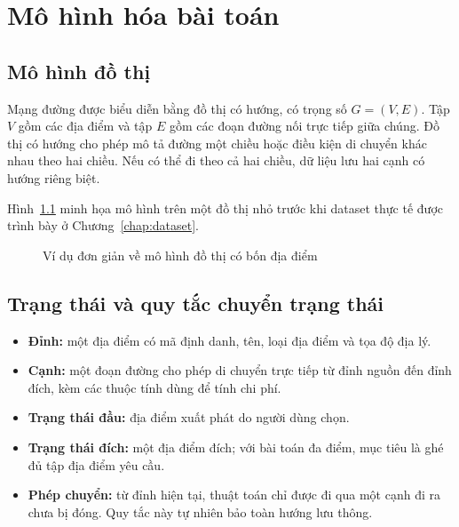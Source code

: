 
\chapter{Mô hình hóa bài toán}
\label{chap:problem-modeling}

\section{Mô hình đồ thị}

Mạng đường được biểu diễn bằng đồ thị có hướng, có trọng số $G=(V,E)$. Tập
$V$ gồm các địa điểm và tập $E$ gồm các đoạn đường nối trực tiếp giữa chúng.
Đồ thị có hướng cho phép mô tả đường một chiều hoặc điều kiện di chuyển khác
nhau theo hai chiều. Nếu có thể đi theo cả hai chiều, dữ liệu lưu hai cạnh có
hướng riêng biệt.

Hình~\ref{fig:example-graph} minh họa mô hình trên một đồ thị nhỏ trước khi
dataset thực tế được trình bày ở Chương~\ref{chap:dataset}.

\begin{figure}[h!]
\centering
{}
\caption{Ví dụ đơn giản về mô hình đồ thị có bốn địa điểm}
\label{fig:example-graph}
\end{figure}

\section{Trạng thái và quy tắc chuyển trạng thái}

\begin{itemize}[itemsep=3pt]
  \item \textbf{Đỉnh:} một địa điểm có mã định danh, tên, loại địa điểm và tọa
  độ địa lý.
  \item \textbf{Cạnh:} một đoạn đường cho phép di chuyển trực tiếp từ đỉnh
  nguồn đến đỉnh đích, kèm các thuộc tính dùng để tính chi phí.
  \item \textbf{Trạng thái đầu:} địa điểm xuất phát do người dùng chọn.
  \item \textbf{Trạng thái đích:} một địa điểm đích; với bài toán đa điểm, mục
  tiêu là ghé đủ tập địa điểm yêu cầu.
  \item \textbf{Phép chuyển:} từ đỉnh hiện tại, thuật toán chỉ được đi qua một
  cạnh đi ra chưa bị đóng. Quy tắc này tự nhiên bảo toàn hướng lưu thông.
\end{itemize}

